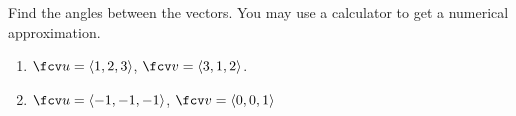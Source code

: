 Find the angles between the vectors. You may use a calculator to get a numerical approximation.

\begin{enumerate}
\item $\fcv u=\langle1,2,3 \rangle$, $\fcv v=\langle3,1,2 \rangle$.

\item $\fcv u=\langle -1,-1,-1 \rangle$, $\fcv v=\langle 0,0,1 \rangle$
\end{enumerate}


